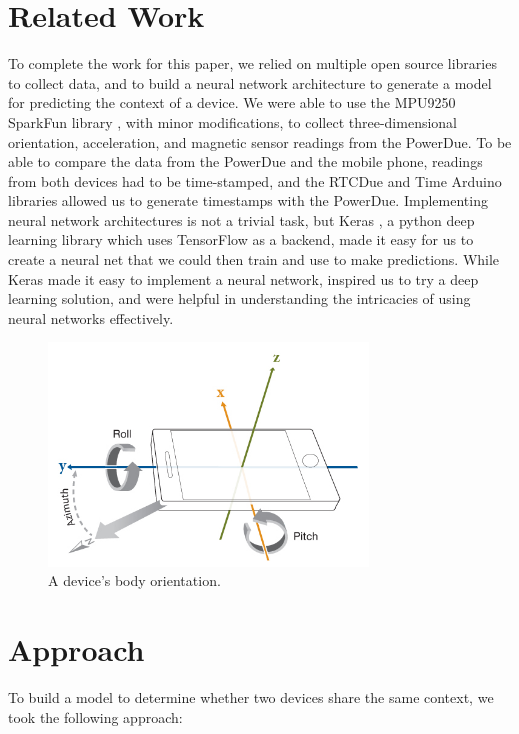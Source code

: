 \documentclass[journal]{IEEEtranTIE}
\begin{document}
\section{Related Work}

To complete the work for this paper, we relied on multiple open source libraries
to collect data, and to build a neural network architecture to generate a model
for predicting the context of a device. We were able to use the MPU9250 SparkFun
library \cite{MPU9250}, with minor modifications, to collect three-dimensional
orientation, acceleration, and magnetic sensor readings from the PowerDue. To be
able to compare the data from the PowerDue and the mobile phone, readings from
both devices had to be time-stamped, and the RTCDue \cite{RTCDue} and Time
\cite{TimeLib} Arduino libraries allowed us to generate timestamps with the
PowerDue. Implementing neural network architectures is not a trivial task, but
Keras \cite{Keras}, a python deep learning library which uses TensorFlow as a
backend, made it easy for us to create a neural net that we could then train and
use to make predictions. While Keras made it easy to implement a neural network,
\cite{LeCunn,DeepLearning} inspired us to try a deep learning solution, and
\cite{DeepLearning,Dropout} were helpful in understanding the intricacies of
using neural networks effectively.


\begin{figure}[!t]\centering
	\includegraphics[width=8.5cm]{phoneOrientation}
	\caption{A device's body orientation.}\label{fig:fig1}
\end{figure}


\section{Approach}

To build a model to determine whether two devices share the same context, we
took the following approach:
\end{document}
